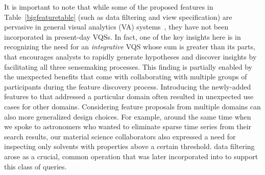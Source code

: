  \par It is important to note that while some of the proposed features in Table~\ref{bigfeaturetable} (such as data filtering and view specification) are pervasive in general visual analytics (VA) systems~\cite{Heer2012,Amar2005}, they have not been incorporated in present-day VQSs. In fact, one of the key insights here is in recognizing the need for an \emph{integrative} VQS whose sum is greater than its parts, that encourages analysts to rapidly generate hypotheses and discover insights by facilitating all three sensemaking processes. This finding is partially enabled by the unexpected benefits that come with collaborating with multiple groups of participants during the feature discovery process. 
  Introducing the newly-added features to \zvpp that addressed a particular domain often resulted in unexpected use cases for other domains. Considering feature proposals from multiple domains can also  more generalized design choices. For example, around the same time when we spoke to astronomers who wanted to eliminate sparse time series from their search results, our material science collaborators also expressed a need for inspecting only solvents with properties above a certain threshold.  data filtering arose as a crucial, common operation that was later incorporated into \zvpp to support this class of queries. %
